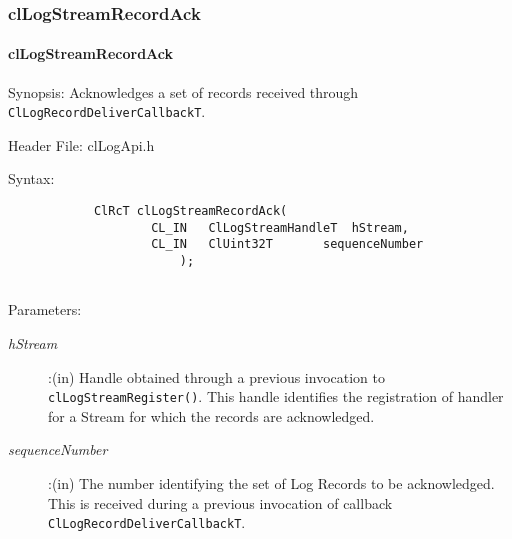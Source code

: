 \begin{flushleft}
\subsubsection{clLogStreamRecordAck}
\hypertarget{pagelog114}{}\paragraph{cl\-Log\-Stream\-Record\-Ack}\label{pagelog114}
\begin{Desc}
\item[Synopsis:] Acknowledges a set of records received through {\tt{ClLogRecordDeliverCallbackT}}. \end{Desc}
\begin{Desc}
\item[Header File:] clLogApi.h \end{Desc}
\begin{Desc}
\item[Syntax:]
\footnotesize\begin{verbatim}        	
			ClRcT clLogStreamRecordAck(
					CL_IN	ClLogStreamHandleT	hStream,
					CL_IN	ClUint32T		sequenceNumber
						);


\end{verbatim}
\normalsize
\end{Desc}
\begin{Desc}
\item[Parameters:] 
\begin{description}
\item[{\em hStream}]:(in) Handle obtained through a previous invocation to {\tt{clLogStreamRegister()}}. This handle identifies the 
registration of handler for a Stream for which the records are acknowledged.
\item[{\em sequenceNumber}]:(in) The number identifying the set of Log Records to be acknowledged. This is received during a previous
invocation of callback {\tt{ClLogRecordDeliverCallbackT}}.
\end{description}
\end{Desc}



\end{flushleft}
